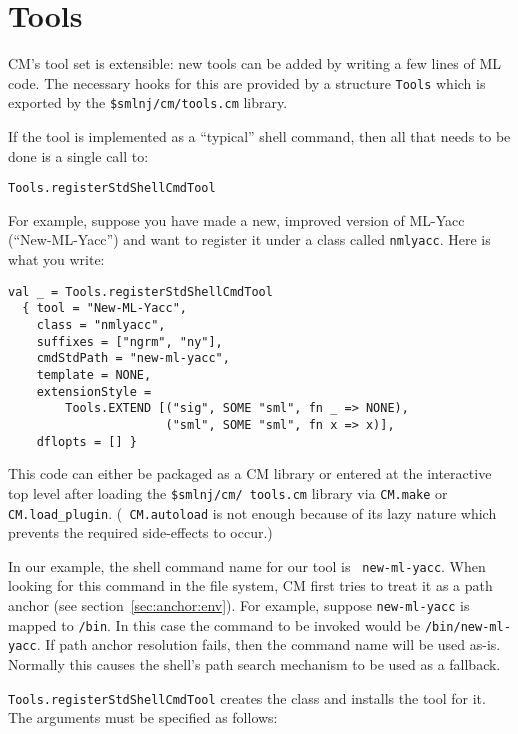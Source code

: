 \documentclass[titlepage,letterpaper]{article}
\begin{document}
\section{Tools}
\label{sec:tools}

CM's tool set is extensible: new tools can be added by writing a few
lines of ML code.  The necessary hooks for this are provided by a
structure {\tt Tools} which is exported by the {\tt \$smlnj/cm/tools.cm}
library.

If the tool is implemented as a ``typical'' shell command, then all
that needs to be done is a single call to:

\begin{verbatim}
Tools.registerStdShellCmdTool
\end{verbatim}

For example, suppose you have made a
new, improved version of ML-Yacc (``New-ML-Yacc'') and want to
register it under a class called {\tt nmlyacc}.  Here is what you
write:

\begin{verbatim}
val _ = Tools.registerStdShellCmdTool
  { tool = "New-ML-Yacc",
    class = "nmlyacc",
    suffixes = ["ngrm", "ny"],
    cmdStdPath = "new-ml-yacc",
    template = NONE,
    extensionStyle =
        Tools.EXTEND [("sig", SOME "sml", fn _ => NONE),
                      ("sml", SOME "sml", fn x => x)],
    dflopts = [] }
\end{verbatim}

\begin{sloppy}
This code can either be packaged as a CM library or entered at the
interactive top level after loading the {\tt \$smlnj/cm/ tools.cm}
library via {\tt CM.make} or {\tt CM.load\_plugin}.  ({\tt
CM.autoload} is not enough because of its lazy nature which prevents
the required side-effects to occur.)
\end{sloppy}

In our example, the shell command name for our tool is {\tt
new-ml-yacc}.  When looking for this command in the file system, CM
first tries to treat it as a path anchor (see
section~\ref{sec:anchor:env}).  For example, suppose {\tt new-ml-yacc} is
mapped to {\tt /bin}.  In this case the command to be
invoked would be {\tt /bin/new-ml-yacc}.  If path anchor resolution
fails, then the command name will be used as-is.  Normally this
causes the shell's path search mechanism to be used as a fallback.

{\tt Tools.registerStdShellCmdTool} creates the class and installs the
tool for it.  The arguments must be specified as follows:
\end{document}
